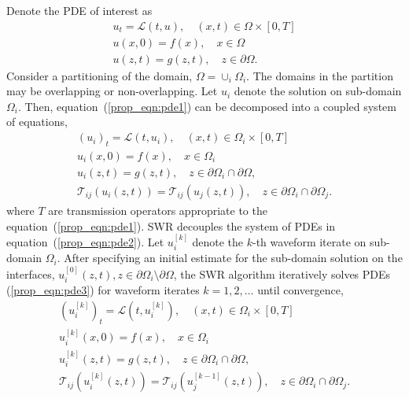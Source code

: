 \documentclass{svmult-ddm}
\begin{document}
Denote the PDE of interest as 
\begin{eqnarray}
  \label{prop_eqn:pde1}
  u_t =  \mathcal{L}(t,u), \quad (x,t)\in \Omega\times[0,T]\\
  \nonumber
  u(x,0) = f(x), \quad x \in \Omega \\
  \nonumber
  u(z,t) = g(z,t), \quad z \in \partial\Omega. 
\end{eqnarray}
Consider a partitioning of the domain, $\Omega = \cup_i\Omega_i$.
The domains in the partition may be overlapping or non-overlapping.
Let $u_i$ denote the solution on sub-domain $\Omega_i$.
Then, equation~(\ref{prop_eqn:pde1}) can be decomposed into a
coupled system of equations,
\begin{eqnarray}
  \label{prop_eqn:pde2}
  (u_i)_t =  \mathcal{L}(t,u_i), \quad (x,t)\in \Omega_i\times[0,T]\\
  \nonumber
  u_i(x,0) = f(x), \quad x \in \Omega_i \\
  \nonumber
  u_i(z,t) = g(z,t), \quad z \in \partial\Omega_i\cap\partial\Omega, \\
  \nonumber
  \mathcal{T}_{ij}(u_{i}(z,t)) = \mathcal{T}_{ij}(u_{j}(z,t)), \quad z \in \partial\Omega_i\cap\partial\Omega_j.
\end{eqnarray}
where $T$ are transmission operators appropriate to the
equation~(\ref{prop_eqn:pde1}).  SWR decouples the system of
PDEs in equation~(\ref{prop_eqn:pde2}).  Let $u_i^{[k]}$
denote the $k$-th waveform iterate on sub-domain $\Omega_i$. After
specifying an initial estimate for the sub-domain solution on the
interfaces, $u_i^{[0]}(z,t),
z\in\partial\Omega_i\setminus\partial\Omega$, the SWR algorithm
iteratively solves PDEs (\ref{prop_eqn:pde3}) for waveform
iterates $k=1,2,\ldots$ until convergence,
\begin{eqnarray}
  \label{prop_eqn:pde3}
  (u_i^{[k]})_t =  \mathcal{L}(t,u_i^{[k]}), \quad (x,t)\in \Omega_i\times[0,T]\\
  \nonumber
  u_i^{[k]}(x,0) = f(x), \quad x \in \Omega_i \\
  \nonumber
  u_i^{[k]}(z,t) = g(z,t), \quad z \in \partial\Omega_i\cap\partial\Omega, \\
  \nonumber
  \mathcal{T}_{ij}(u_{i}^{[k]}(z,t)) = \mathcal{T}_{ij}(u_{j}^{[k-1]}(z,t)), \quad z \in \partial\Omega_i\cap\partial\Omega_j.
\end{eqnarray}
\end{document}
